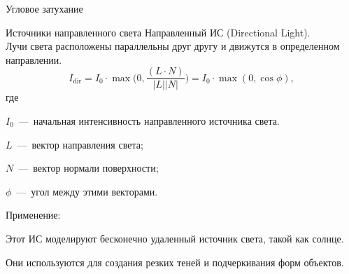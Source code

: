 \documentclass{beamer}
\begin{document}
\begin{frame}{Угловое затухание}
	\end{frame}


	\begin{frame}{Источники направленного света}
		Направленный ИС (Directional Light).\\
		Лучи света расположены параллельны друг другу и движутся в определенном направлении. \\
		
		\[
			I_{\text{dir}} 
			= 
			I_0 \cdot \max \bigg( 0, \frac{(L \cdot N)}{\lvert L \rvert \lvert N \rvert} \bigg)
			= 
			I_0 \cdot \max(0,  \cos \phi)
			,
		\]
		где
		
		$I_0$~---~начальная интенсивность направленного источника света.

		$L$~---~вектор направления света;

		$N$~---~вектор нормали поверхности;
		
		$\phi$~---~угол между этими векторами.


		Применение:
		
		Этот ИС моделируют бесконечно удаленный источник света, такой как солнце. 

		Они используются для создания резких теней и подчеркивания форм объектов.

		
	\end{frame}
	
\end{document}
